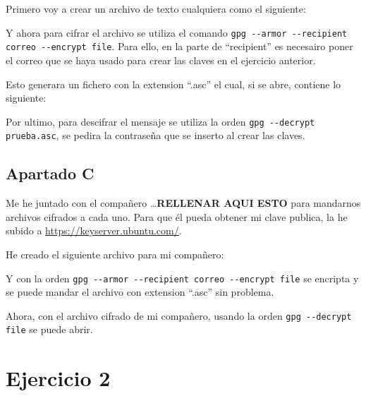 \documentclass{article}
\begin{document}
Primero voy a crear un archivo de texto cualquiera como el siguiente:



Y ahora para cifrar el archivo se utiliza el comando \verb|gpg --armor --recipient correo --encrypt file|. Para ello, en la parte de ``recipient'' es necesairo poner el correo que se haya usado para crear las claves en el ejercicio anterior.

Esto generara un fichero con la extension ``.asc'' el cual, si se abre, contiene lo siguiente:


Por ultimo, para descifrar el mensaje se utiliza la orden \verb|gpg --decrypt prueba.asc|, se pedira la contraseña que se inserto al crear las claves.




\subsection*{Apartado C}

Me he juntado con el compañero \dots \textbf{RELLENAR AQUI ESTO} para mandarnos archivos cifrados a cada uno. Para que él pueda obtener mi clave publica, la he subido a \url{https://keyserver.ubuntu.com/}.

He creado el siguiente archivo para mi compañero:


Y con la orden \verb|gpg --armor --recipient correo --encrypt file| se encripta y se puede mandar el archivo con extension ``.asc'' sin problema.



Ahora, con el archivo cifrado de mi compañero, usando la orden \verb|gpg --decrypt file| se puede abrir.



\section*{Ejercicio 2}
\end{document}

